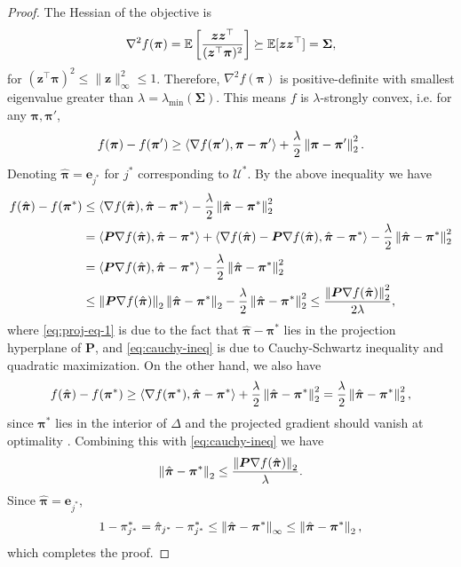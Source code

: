 \begin{proof}
The Hessian of the objective is
\begin{align*}
    \nabla^2f(\bm\pi)=\mathbb{E}\left[\frac{\bm z\bm z^\top}{(\bm z^\top\bm\pi)^2}\right]\succeq\mathbb{E}[\bm z\bm z^\top]=\bm\Sigma,
\end{align*}
for $(\bm z^\top\bm\pi)^2\leq\|\bm z\|_\infty^2\leq1$. Therefore, $\nabla^2f(\bm\pi)$ is positive-definite with smallest eigenvalue greater than $\lambda=\lambda_{\min}(\bm\Sigma)$. This means $f$ is $\lambda$-strongly convex, i.e. for any $\bm\pi,\bm\pi'$,
\begin{align*}
    f(\bm\pi)-f(\bm\pi')\geq\left<{\nabla f(\bm\pi'),\bm\pi-\bm\pi'}\right>+\frac{\lambda}{2}\left\|{\bm\pi-\bm\pi'}\right\|^2_2.
\end{align*}
Denoting $\hat{\bm\pi}=\bm e_{j^*}$ for $j^*$ corresponding to $\mathcal U^*$. By the above inequality we have
\begin{align}
    f(\hat{\bm\pi})-f(\bm \pi^*)&\leq\left<{\nabla f(\hat{\bm\pi}),\hat{\bm\pi}-\bm\pi^*}\right>-\frac{\lambda}{2}\left\|{\hat{\bm\pi}-\bm\pi^*}\right\|^2_2\nonumber\\
    &=\left<{\bm P\nabla f(\hat{\bm\pi}),\hat{\bm\pi}-\bm\pi^*}\right>+\left<{\nabla f(\hat{\bm\pi})-\bm P\nabla f(\hat{\bm\pi}),\hat{\bm\pi}-\bm\pi^*}\right>-\frac{\lambda}{2}\left\|{\hat{\bm\pi}-\bm\pi^*}\right\|^2_2\nonumber\\
    &=\left<{\bm P\nabla f(\hat{\bm\pi}),\hat{\bm\pi}-\bm\pi^*}\right>-\frac{\lambda}{2}\left\|{\hat{\bm\pi}-\bm\pi^*}\right\|^2_2\label{eq:proj-eq-1}\\
    &\leq \left\|{\bm P\nabla f(\hat{\bm\pi})}\right\|_2\left\|{\hat{\bm\pi}-\bm\pi^*}\right\|_2-\frac{\lambda}{2}\left\|{\hat{\bm\pi}-\bm\pi^*}\right\|_2^2\leq\frac{\left\|{\bm P\nabla f(\hat{\bm\pi})}\right\|_2^2}{2\lambda}\label{eq:cauchy-ineq},
\end{align}
where \eqref{eq:proj-eq-1} is due to the fact that $\hat{\bm\pi}-\bm\pi^*$ lies in the projection hyperplane of $\bm P$, and \eqref{eq:cauchy-ineq} is due to Cauchy-Schwartz inequality and quadratic maximization. On the other hand, we also have
\begin{align*}
    f(\hat{\bm\pi})-f(\bm\pi^*)\geq\left<{\nabla f(\bm\pi^*),\hat{\bm\pi}-\bm\pi^*}\right>+\frac{\lambda}{2}\left\|{\hat{\bm\pi}-\bm\pi^*}\right\|^2_2=\frac{\lambda}{2}\left\|{\hat{\bm\pi}-\bm\pi^*}\right\|^2_2,
\end{align*}
since $\bm\pi^*$ lies in the interior of $\Delta$ and the projected gradient should vanish at optimality \citep{wright2022optimization}. Combining this with \eqref{eq:cauchy-ineq} we have
\begin{align*}
    \left\|{\hat{\bm\pi}-\bm\pi^*}\right\|_2\leq\frac{\left\|{\bm P\nabla f(\hat{\bm\pi})}\right\|_2}{\lambda}.
\end{align*}
Since ${\hat{\bm\pi}}=\bm e_{j^*}$,
\begin{align*}
    1-\pi^*_{j^*}=\hat{\pi}_{j^*}-\pi^*_{j^*}\leq\left\|{\hat{\bm\pi}-\bm\pi^*}\right\|_\infty\leq\left\|{\hat{\bm\pi}-\bm\pi^*}\right\|_2,
\end{align*}
which completes the proof.
\end{proof}

